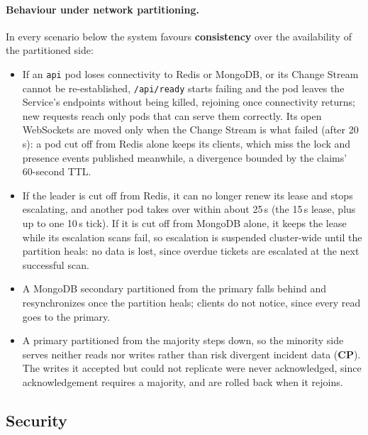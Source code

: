 \documentclass{scrartcl}
\begin{document}
\paragraph{Behaviour under network partitioning.} In every scenario below the system favours \textbf{consistency} over the availability of the partitioned side:
%
\begin{itemize}
  \item If an \texttt{api} pod loses connectivity to Redis or MongoDB, or its Change Stream cannot be re-established, \texttt{/api/ready} starts failing and the pod leaves the Service's endpoints without being killed, rejoining once connectivity returns; new requests reach only pods that can serve them correctly. Its open WebSockets are moved only when the Change Stream is what failed (after 20\,s): a pod cut off from Redis alone keeps its clients, which miss the lock and presence events published meanwhile, a divergence bounded by the claims' 60-second TTL.
  \item If the leader is cut off from Redis, it can no longer renew its lease and stops escalating, and another pod takes over within about 25\,s (the 15\,s lease, plus up to one 10\,s tick). If it is cut off from MongoDB alone, it keeps the lease while its escalation scans fail, so escalation is suspended cluster-wide until the partition heals: no data is lost, since overdue tickets are escalated at the next successful scan.
  \item A MongoDB secondary partitioned from the primary falls behind and resynchronizes once the partition heals; clients do not notice, since every read goes to the primary.
  \item A primary partitioned from the majority steps down, so the minority side serves neither reads nor writes rather than risk divergent incident data (\textbf{CP}). The writes it accepted but could not replicate were never acknowledged, since acknowledgement requires a majority, and are rolled back when it rejoins.
\end{itemize}
 
\subsection{Security}\label{security}
 
\end{document}
